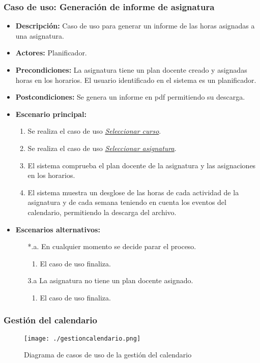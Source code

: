 \subsubsection*{Caso de uso: Generación de informe de asignatura}
\begin{itemize}
\item{\bf Descripción:} Caso de uso para generar un informe de las horas asignadas a una asignatura.
\item{\bf Actores:} Planificador.
\item{\bf Precondiciones:} La asignatura tiene un plan docente creado y asignadas horas en los horarios. El usuario identificado en el sistema es un planificador.
\item{\bf Postcondiciones:} Se genera un informe en pdf permitiendo su descarga.
\item{\bf Escenario principal:}
	\begin{enumerate}
	\item Se realiza el caso de uso {\em \hyperref[select_curso]{Seleccionar curso}}.
	\item Se realiza el caso de uso {\em \hyperref[select_asignatura]{Seleccionar asignatura}}.
	\item El sistema comprueba el plan docente de la asignatura y las asignaciones en los horarios.
	\item El sistema muestra un desglose de las horas de cada actividad de la asignatura y de cada semana teniendo en cuenta los eventos del calendario, permitiendo la descarga del archivo.
	\end{enumerate}
\item{\bf Escenarios alternativos:}
	\begin{itemize}
		\item[*.a.] En cualquier momento se decide parar el proceso.
		\begin{enumerate}
			\item El caso de uso finaliza.
		\end{enumerate}
		\item[3.a] La asignatura no tiene un plan docente asignado.
		\begin{enumerate}
			\item El caso de uso finaliza.
		\end{enumerate}
	\end{itemize}
\end{itemize}

\subsubsection{Gestión del calendario}
\begin{figure}[H] 
  \label{gestion-calendario} 
	\begin{center}
    \texttt{[image: ./gestioncalendario.png]}
  \end{center}
\caption{Diagrama de casos de uso de la gestión del calendario}
\end{figure}


